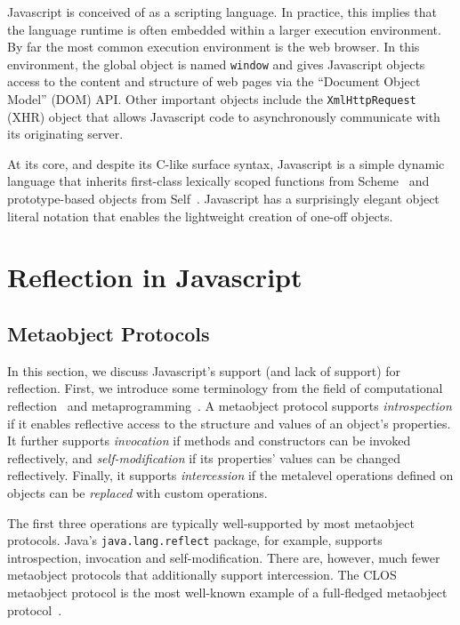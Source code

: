 \documentclass[10pt,legalpaper]{article}
\begin{document}
Javascript is conceived of as a scripting language. In practice, this implies that the language runtime is often embedded within a larger execution environment. By far the most common execution environment is the web browser. In this environment, the global object is named \texttt{window} and gives Javascript objects access to the content and structure of web pages via the ``Document Object Model'' (DOM) API. Other important objects include the \texttt{XmlHttpRequest} (XHR) object that allows Javascript code to asynchronously communicate with its originating server.

At its core, and despite its C-like surface syntax, Javascript is a simple dynamic language that inherits first-class lexically scoped functions from Scheme~\cite{scheme} and prototype-based objects from Self~\cite{self}. Javascript has a surprisingly elegant object literal notation that enables the lightweight creation of one-off objects.

\section{Reflection in Javascript}

\subsection{Metaobject Protocols}
In this section, we discuss Javascript's support (and lack of support) for reflection. First, we introduce some terminology from the field of computational reflection~\cite{maes-oopsla87} and metaprogramming~\cite{kiczales-artofthemop}. A metaobject protocol supports \emph{introspection} if it enables reflective access to the structure and values of an object's properties. It further supports \emph{invocation} if methods and constructors can be invoked reflectively, and \emph{self-modification} if its properties' values can be changed reflectively. Finally, it supports \emph{intercession} if the metalevel operations defined on objects can be \emph{replaced} with custom operations.

The first three operations are typically well-supported by most metaobject protocols. Java's \texttt{java.lang.reflect} package, for example, supports introspection, invocation and self-modification. There are, however, much fewer metaobject protocols that additionally support intercession. The CLOS metaobject protocol is the most well-known example of a full-fledged metaobject protocol~\cite{clos}.
\end{document}

